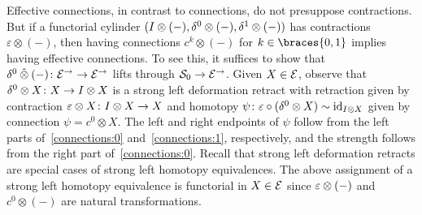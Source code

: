 \documentclass[reqno,10pt,a4paper,oneside,draft]{amsart}
\begin{document}
\begin{remark} \label{connections-are-effective}
Effective connections, in contrast to connections, do not presuppose contractions.
But if a functorial cylinder
$(I \otimes (-), \delta^0 \otimes (-), \delta^1 \otimes (-))$ has contractions $\varepsilon \otimes (-)$, then having connections $c^k \otimes (-)$ for $k \in \braces{0, 1}$ implies having effective connections.
To see this, it suffices to show that $\delta^0 \mathbin{\hat{\otimes}} (-) \colon \mathcal{E}^\to \to \mathcal{E}^\to$ lifts through $\mathcal{S}_0 \to \mathcal{E}^\to$.
Given $X \in \mathcal{E}$, observe that $\delta^0 \otimes X \colon X \to I \otimes X$ is a strong left deformation retract with retraction given by contraction $\varepsilon \otimes X \colon I \otimes X \to X$ and homotopy $\psi \colon \varepsilon \mathbin{\circ} (\delta^0 \otimes X) \sim \operatorname{id}_{I \otimes X}$ given by connection $\psi = c^0 \otimes X$.
The left and right endpoints of $\psi$ follow from the left parts of~\eqref{connections:0} and~\eqref{connections:1}, respectively, and the strength follows from the right part of~\eqref{connections:0}.
Recall that strong left deformation retracts are special cases of strong left homotopy equivalences.
The above assignment of a strong left homotopy equivalence is functorial in $X \in \mathcal{E}$ since $\varepsilon \otimes (-)$ and $c^0 \otimes (-)$ are natural transformations.
\end{remark}
\end{document}
